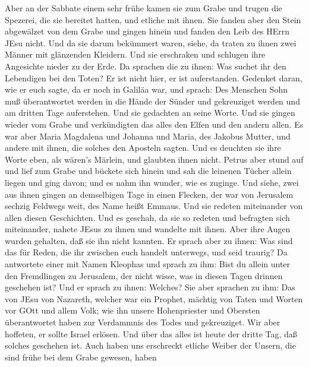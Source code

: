  Aber an der Sabbate einem sehr frühe kamen sie zum Grabe
und trugen die Spezerei, die sie bereitet hatten, und etliche mit ihnen.
 Sie fanden aber den Stein abgewälzet von dem Grabe
 und gingen hinein und fanden den Leib des HErrn JEsu nicht.
 Und da sie darum bekümmert waren, siehe, da traten zu ihnen
zwei Männer mit glänzenden Kleidern.  Und sie erschraken und
schlugen ihre Angesichte nieder zu der Erde. Da sprachen die zu ihnen:
Was suchet ihr den Lebendigen bei den Toten?  Er ist nicht
hier, er ist auferstanden. Gedenket daran, wie er euch sagte, da er noch
in Galiläa war,  und sprach: Des Menschen Sohn muß
überantwortet werden in die Hände der Sünder und gekreuziget werden und
am dritten Tage auferstehen.  Und sie gedachten an seine
Worte.  Und sie gingen wieder vom Grabe und verkündigten das
alles den Elfen und den andern allen.  Es war aber Maria
Magdalena und Johanna und Maria, des Jakobus Mutter, und andere mit
ihnen, die solches den Aposteln sagten.  Und es deuchten
sie ihre Worte eben, als wären's Märlein, und glaubten ihnen nicht.
 Petrus aber stund auf und lief zum Grabe und bückete sich
hinein und sah die leinenen Tücher allein liegen und ging davon; und es
nahm ihn wunder, wie es zuginge.  Und siehe, zwei aus ihnen
gingen an demselbigen Tage in einen Flecken, der war von Jerusalem
sechzig Feldwegs weit, des Name heißt Emmaus.  Und sie
redeten miteinander von allen diesen Geschichten.  Und es
geschah, da sie so redeten und befragten sich miteinander, nahete JEsus
zu ihnen und wandelte mit ihnen.  Aber ihre Augen wurden
gehalten, daß sie ihn nicht kannten.  Er sprach aber zu
ihnen: Was sind das für Reden, die ihr zwischen euch handelt unterwegs,
und seid traurig?  Da antwortete einer mit Namen Kleophas
und sprach zu ihm: Bist du allein unter den Fremdlingen zu Jerusalem,
der nicht wisse, was in diesen Tagen drinnen geschehen ist?
 Und er sprach zu ihnen: Welches? Sie aber sprachen zu ihm:
Das von JEsu von Nazareth, welcher war ein Prophet, mächtig von Taten
und Worten vor GOtt und allem Volk;  wie ihn unsere
Hohenpriester und Obersten überantwortet haben zur Verdammnis des Todes
und gekreuziget.  Wir aber hoffeten, er sollte Israel
erlösen. Und über das alles ist heute der dritte Tag, daß solches
geschehen ist.  Auch haben uns erschreckt etliche Weiber
der Unsern, die sind frühe bei dem Grabe gewesen,  haben
